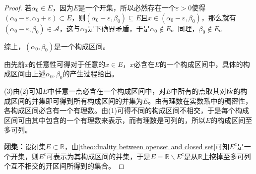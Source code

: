 \begin{proof}
	若$\alpha_0\in E$，因为$E$是一个开集，所以必然存在一个$\varepsilon>0$使得$(\alpha_0-\varepsilon,\alpha_0+\varepsilon)\subset E$，则$(\alpha_0-\varepsilon,\beta_0)\subseteq E$且$x\in(\alpha_0-\varepsilon,\beta_0)$，那么就有$(\alpha_0-\varepsilon,\beta_0)\in \mathscr{A}$，这与$\alpha_0$是下确界矛盾，于是$\alpha_0\notin E$。同理，$\beta_0\notin E$。\par
	综上，$(\alpha_0,\beta_0)$是一个构成区间。\par
	由先前$x$的任意性可得对于任意的$x\in E$，$x$必含在$E$的一个构成区间中，具体的构成区间由上述$\alpha_0,\beta_0$的产生过程给出。\par
	(3)由(2)可知$E$中任意一点必含在一个构成区间中，对$E$中所有的点取其对应的构成区间的并集即可得到所有构成区间的并集为$E$。由有理数在实数系中的稠密性，各构成区间必含有一个有理数。由(1)可得不同的构成区间不相交，于是每个构成区间可由其中包含的一个有理数来表示，而有理数是可列的，所以$E$的构成区间至多可列。\par
	\textbf{闭集：}设闭集$E\subset\mathbb{R}$，由\cref{theo:duality between openset and closed set}可知$E^c$是一个开集，则$E^c$可表示为其构成区间的并集，于是$E=\mathbb{R}\backslash E^c$是从$\mathbb{R}$上挖掉至多可列个互不相交的开区间所得到的集合。
\end{proof}
